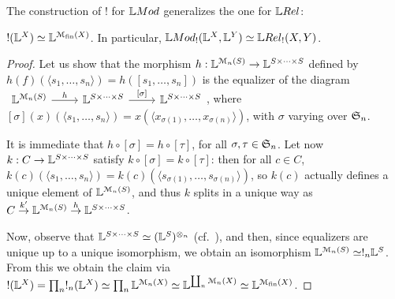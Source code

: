 %
%
The construction of $!$ for $\Mod$ generalizes the one for $\LREL$:
\begin{proposition}\label{prop:pinv3}
$!(\mathbb{L}^{X})\simeq \mathbb{L}^{\mathcal{M}_{\mathrm{fin}}(X)}$. In particular, $\Mod_{!}(\Lawv^{X},\Lawv^{Y})\simeq \LREL_{!}(X,Y)$.
\end{proposition}
\begin{proof}
Let us show that the morphism $h:\mathbb{L}^{\mathcal{M}_{n}(S)}\to \mathbb{L}^{S\times \dots \times S}$ defined by 
$
h(f)(\langle s_{1},\dots, s_{n}\rangle)=h([s_{1},\dots, s_{n}])
$
is the equalizer of the diagram 
$
\begin{tikzcd}
\Lawv^{\C M_{n}(S)} \ar{r}{h} &\Lawv^{S\times \dots \times S}\ar{r}{[\sigma]} &
\Lawv^{S\times \dots \times S}
\end{tikzcd}
$, 
where $[\sigma](x)(\langle s_{1},\dots, s_{n}\rangle)=x(\langle x_{\sigma(1)},\dots, x_{\sigma(n)}\rangle)$, with $\sigma$ varying over $\mathfrak{S}_{n}$.

It is immediate that $h\circ [\sigma]=h\circ [\tau]$, for all $\sigma,\tau\in \mathfrak{S}_{n}$. Let now $k: C\to \mathbb{L}^{S\times \dots \times S}$ satisfy $k\circ [\sigma]=k\circ [\tau]$: then for all $c\in C$, $k(c)(\langle s_{1},\dots, s_{n}\rangle)=k(c)(\langle s_{\sigma(1)},\dots, s_{\sigma(n)}\rangle)$, so $k(c)$ actually defines a unique element of $\mathbb{L}^{\mathcal{M}_{n}(S)}$, and thus $k$ splits in a unique way as $C \stackrel{k'}{\to} \mathbb{L}^{\mathcal{M}_{n}(S)} \stackrel{h}{\to}\mathbb{L}^{S\times \dots \times S}$.

Now, observe that 
$\mathbb{L}^{S\times \dots \times S}\simeq (\mathbb{L}^{S})^{\otimes_{n}}$ (cf.~\cite[Corollary 4.7.12 ($iii$)]{Russo2007}), and then, since equalizers are unique up to a unique isomorphism, we obtain an isomorphism $\mathbb{L}^{\mathcal{M}_{n}(S)}\simeq !_{n}\mathbb{L}^{S}$. From this we obtain the claim via $!(\mathbb{L}^{X})=\prod_{n}!_{n}(\mathbb{L}^{X})\simeq\prod_{n}\mathbb{L}^{\mathcal M_{n}(X)}\simeq 
\mathbb{L}^{\coprod_{n}\mathcal M_{n}(X)}\simeq
\mathbb{L}^{\mathcal{M}_{\mathrm{fin}}(X)}$.
%
%
\end{proof}




